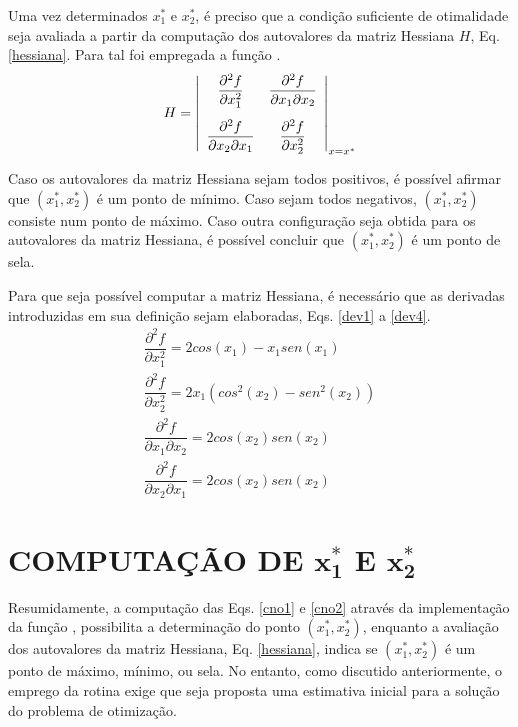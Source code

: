 \documentclass[12pt]{article}
\begin{document}
	Uma vez determinados $ x_1^* $ e $ x_2^* $, é preciso que a condição suficiente de otimalidade seja avaliada a partir da computação dos autovalores da matriz Hessiana $ H $, Eq. \ref{hessiana}. Para tal foi empregada a função  \citep{eig}.
	\begin{equation}
		H = \left| \begin{array}{cc} 
			\dfrac{\partial^2 f}{\partial x_1^2} & \dfrac{\partial^2 f}{\partial x_1 \partial x_2} \vspace{0.3cm}\\ 
			\dfrac{\partial^2 f}{\partial x_2 \partial x_1} & \dfrac{\partial^2 f}{\partial x_2^2}
		\end{array} \right|_{x = x^*}
		\label{hessiana}
	\end{equation}
	
	Caso os autovalores da matriz Hessiana sejam todos positivos, é possível afirmar que $ (x_1^*, x_2^*) $ é um ponto de mínimo. Caso sejam todos negativos, $ (x_1^*, x_2^*) $ consiste num ponto de máximo. Caso outra configuração seja obtida para os autovalores da matriz Hessiana, é possível concluir que $ (x_1^*, x_2^*) $ é um ponto de sela.
	
	Para que seja possível computar a matriz Hessiana, é necessário que as derivadas introduzidas em sua definição sejam elaboradas, Eqs. \ref{dev1} a \ref{dev4}.
	\begin{gather}
		\dfrac{\partial^2 f}{\partial x_1^2} = 2 cos(x_1) - x_1 sen(x_1) \label{dev1} \\
		\dfrac{\partial^2 f}{\partial x_2^2} = 2 x_1 (cos^2(x_2) - sen^2(x_2)) \label{dev2} \\
		\dfrac{\partial^2 f}{\partial x_1 \partial x_2} = 2 cos(x_2) sen(x_2) \label{dev3}  \\
		\dfrac{\partial^2 f}{\partial x_2 \partial x_1} = 2 cos(x_2) sen(x_2) \label{dev4} 
	\end{gather}
	
	\section{COMPUTAÇÃO DE $\pmb{x_1^*}$ E $\pmb{x_2^*}$}
	
	Resumidamente, a computação das Eqs. \ref{cno1} e \ref{cno2} através da implementação da função , possibilita a determinação do ponto $ (x_1^*, x_2^*) $, enquanto a avaliação dos autovalores da matriz Hessiana, Eq. \ref{hessiana}, indica se $ (x_1^*, x_2^*) $ é um ponto de máximo, mínimo, ou sela. No entanto, como discutido anteriormente, o emprego da rotina  exige que seja proposta uma estimativa inicial para a solução do problema de otimização.
	
\end{document}
